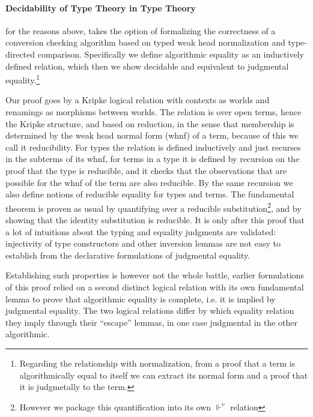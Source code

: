 \documentclass{book}
\begin{document}
\paragraph{Decidability of Type Theory in Type Theory} for the reasons above,
takes the option of formalizing the correctness of a conversion
checking algorithm based on typed weak head normalization and
type-directed comparison. Specifically we define algorithmic equality
as an inductively defined relation, which then we show decidable and
equivalent to judgmental equality.\footnote{Regarding the relationship with
normalization, from a proof that a term is algorithmically equal to
itself we can extract its normal form and a
proof that it is judgmetally to the term.}

Our proof goes by a Kripke logical relation with contexts as worlds
and renamings as morphisms between worlds. The relation is over open
terms, hence the Kripke structure, and based on reduction, in the
sense that membership is determined by the weak head normal form
(whnf) of a term, because of this we call it reducibility. For types
the relation is defined inductively and just recurses in the subterms
of its whnf, for terms in a type it is defined by recursion on the
proof that the type is reducible, and it checks that the observations
that are possible for the whnf of the term are also reducible. By the
same recursion we also define notions of reducible equality for types
and terms. The fundamental theorem is proven as usual by quantifying
over a reducible substitution\footnote{However we package this
  quantification into its own $\Vdash^v$ relation}, and by showing
that the identity substitution is reducible. It is only after this
proof that a lot of intuitions about the typing and equality judgments
are validated: injectivity of type constructors and other inversion
lemmas are not easy to establish from the declarative formulations of
judgmental equality.

Establishing such properties is however not the whole battle, earlier
formulations of this proof \cite{abelScherer:types10,abelCoquandMannaa:types16}
relied on a second distinct logical relation with its own fundamental
lemma to prove that algorithmic equality is complete, i.e. it is
implied by judgmental equality. The two logical relations differ by
which equality relation they imply through their ``escape'' lemmas, in one
case judgmental in the other algorithmic.
\end{document}

